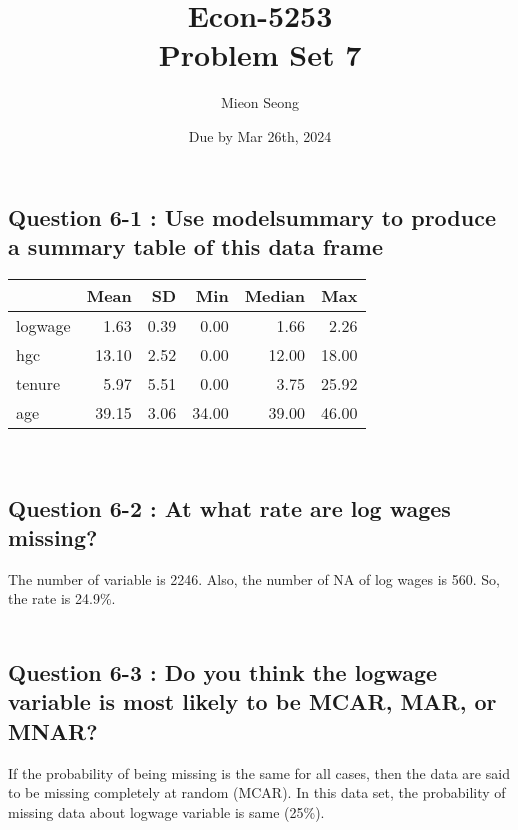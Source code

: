 \documentclass[12pt, letterpaper]{article}
\title{Econ-5253\\
{Problem Set 7}  \\
\large  \vspace{-1em}}
\author{Mieon Seong}
\date{Due by Mar 26th, 2024}
\begin{document}
\setlength{\abovedisplayskip}{5pt}
\setlength{\belowdisplayskip}{5pt}
\setlength{\abovedisplayshortskip}{5pt}
\setlength{\belowdisplayshortskip}{5pt}

\maketitle

\subsection*{Question 6-1 : Use modelsummary to produce a summary table of this data frame}

\begin{table}[h]
\centering
\begin{tabular}[t]{lrrrrr}
\toprule
  & Mean & SD & Min & Median & Max\\
\midrule
logwage & \num{1.63} & \num{0.39} & \num{0.00} & \num{1.66} & \num{2.26}\\
hgc & \num{13.10} & \num{2.52} & \num{0.00} & \num{12.00} & \num{18.00}\\
tenure & \num{5.97} & \num{5.51} & \num{0.00} & \num{3.75} & \num{25.92}\\
age & \num{39.15} & \num{3.06} & \num{34.00} & \num{39.00} & \num{46.00}\\
\bottomrule
\end{tabular}
\end{table}
\\
\subsection*{Question 6-2 : At what rate are log wages missing?}
\noindent The number of variable is 2246. Also, the number of NA of log wages is 560. So, the rate is 24.9\%.
\\
\\
\subsection*{Question 6-3 : Do you think the logwage variable is most likely to be MCAR, MAR, or MNAR?}
\noindent If the probability of being missing is the same for all cases, then the data are said to be missing completely at random (MCAR). In this data set, the probability of missing data about logwage variable is same (25\%). 
\\
\\
\newpage
\end{document}
